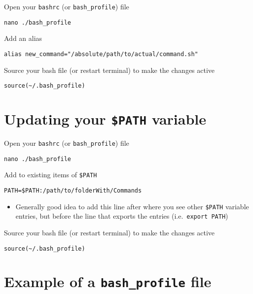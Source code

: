 \documentclass[
  letterpaper,
  DIV=11,
  numbers=noendperiod]{scrreprt}
\providecommand{\tightlist}{%
  \setlength{\itemsep}{0pt}\setlength{\parskip}{0pt}}\usepackage{longtable,booktabs,array}
\begin{document}
Open your \texttt{bashrc} (or \texttt{bash\_profile}) file

\begin{verbatim}
nano ./bash_profile
\end{verbatim}

Add an alias

\begin{verbatim}
alias new_command="/absolute/path/to/actual/command.sh"
\end{verbatim}

Source your bash file (or restart terminal) to make the changes active

\begin{verbatim}
source(~/.bash_profile)
\end{verbatim}

\hypertarget{updating-your-path-variable}{%
\section*{\texorpdfstring{\textbf{Updating your \texttt{\$PATH}
variable}}{Updating your \$PATH variable}}\label{updating-your-path-variable}}

Open your \texttt{bashrc} (or \texttt{bash\_profile}) file

\begin{verbatim}
nano ./bash_profile
\end{verbatim}

Add to existing items of \texttt{\$PATH}

\begin{verbatim}
PATH=$PATH:/path/to/folderWith/Commands
\end{verbatim}

\begin{itemize}
\tightlist
\item
  Generally good idea to add this line after where you see other
  \texttt{\$PATH} variable entries, but before the line that exports the
  entries (i.e.~\texttt{export\ PATH})
\end{itemize}

Source your bash file (or restart terminal) to make the changes active

\begin{verbatim}
source(~/.bash_profile)
\end{verbatim}

\hypertarget{example-of-a-bash_profile-file}{%
\section*{\texorpdfstring{\textbf{Example of a \texttt{bash\_profile}
file}}{Example of a bash\_profile file}}\label{example-of-a-bash_profile-file}}
\end{document}
